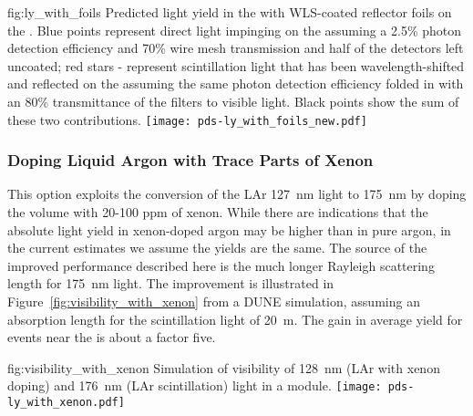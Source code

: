 \begin{dunefigure}{fig:ly_with_foils}
{Predicted light yield in the  with WLS-coated reflector foils on the . Blue points represent direct  light impinging on the  assuming a 2.5\% photon detection efficiency and 70\% wire mesh transmission and half of the detectors left uncoated; red stars - represent scintillation light that has been wavelength-shifted and reflected on the  assuming the same photon detection efficiency folded in with an 80\% transmittance of the filters to visible light. Black points show the sum of these two contributions.}
\texttt{[image: pds-ly\_with\_foils\_new.pdf]}
\end{dunefigure}

\subsubsection{Doping Liquid Argon with Trace Parts of Xenon}
\label{sec:fdsp-pd-enh-xenon}


This option exploits the conversion of the LAr \SI{127}{nm} light to \SI{175}{nm} by doping the \lar volume with 20-100 ppm of xenon.  While there are indications that the absolute light yield in xenon-doped argon may be higher than in pure argon, in the current estimates we assume the yields are the same. The source of the improved performance described here is the much longer Rayleigh scattering length for \SI{175}{nm} light.  The improvement is illustrated in Figure~\ref{fig:visibility_with_xenon} from a DUNE  simulation, assuming an absorption length for the scintillation light of \SI{20}{m}. The gain in average yield for events near the  is about a factor five.

\begin{dunefigure}
{fig:visibility_with_xenon}
{Simulation of visibility of \SI{128}{nm} (LAr with xenon doping) and \SI{176}{nm} (LAr scintillation) light in a  module.}
\texttt{[image: pds-ly\_with\_xenon.pdf]}
\end{dunefigure}

